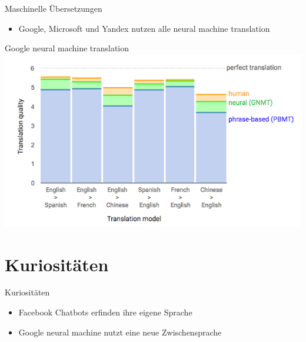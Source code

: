 \documentclass[18pt]{beamer}
\begin{document}
\begin{frame}{Maschinelle Übersetzungen}
\begin{itemize}
\item{Google, Microsoft und Yandex nutzen alle neural machine translation}
\end{itemize}
\end{frame}

\begin{frame}{Google neural machine translation}
\includegraphics[scale=0.5]{images/MTGoogle.png}
\cite{googleaiblog_2016}
\end{frame}

\section{Kuriositäten}

\begin{frame}{Kuriositäten}
\begin{itemize}
\item{Facebook Chatbots erfinden ihre eigene Sprache}
\item{Google neural machine nutzt eine neue Zwischensprache}
\end{itemize}
\end{frame}
\end{document}
